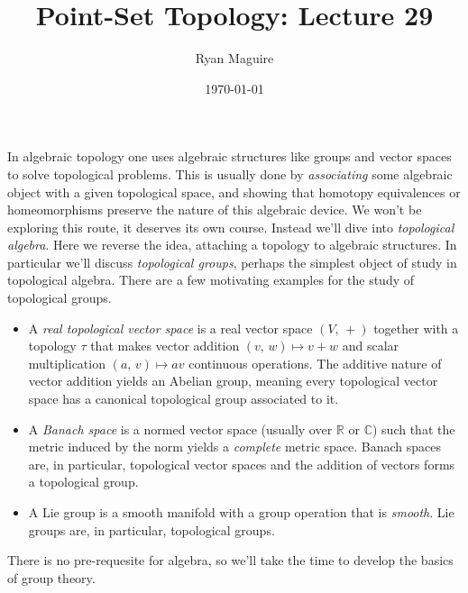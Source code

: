 \documentclass{article}
\title{Point-Set Topology: Lecture 29}
\author{Ryan Maguire}
\date{\today}
\theoremstyle{plain}
\theoremstyle{normal}
\begin{document}
    \maketitle
    In algebraic topology one uses algebraic structures like groups and
    vector spaces to solve topological problems. This is usually done by
    \textit{associating} some algebraic object with a given topological space,
    and showing that homotopy equivalences or homeomorphisms preserve
    the nature of this algebraic device. We won't be exploring this route, it
    deserves its own course. Instead we'll dive into
    \textit{topological algebra}. Here we reverse the idea, attaching a
    topology to algebraic structures. In particular we'll discuss
    \textit{topological groups}, perhaps the simplest object of study in
    topological algebra. There are a few motivating examples for the study of
    topological groups.
    \begin{itemize}
        \item A \textit{real topological vector space} is a real vector space
            $(V,\,+)$ together with a topology $\tau$ that makes vector
            addition $(v,\,w)\mapsto{v+w}$ and scalar multiplication
            $(a,\,v)\mapsto{a}v$ continuous operations. The additive nature of
            vector addition yields an Abelian group, meaning every topological
            vector space has a canonical topological group associated to it.
        \item A \textit{Banach space} is a normed vector space (usually over
            $\mathbb{R}$ or $\mathbb{C}$) such that the metric induced by the
            norm yields a \textit{complete} metric space. Banach spaces are,
            in particular, topological vector spaces and the addition of
            vectors forms a topological group.
        \item A Lie group is a smooth manifold with a group operation that is
            \textit{smooth}. Lie groups are, in particular, topological groups.
    \end{itemize}
    There is no pre-requesite for algebra, so we'll take the time to develop
    the basics of group theory.
\end{document}
